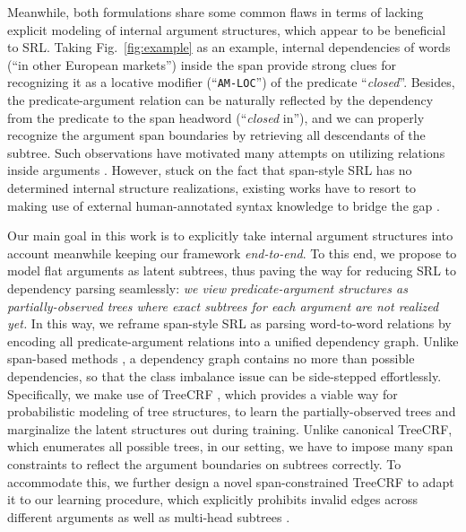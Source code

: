 \documentclass[11pt]{article}
\newcommand{\brickred}[1]{\textcolor{brickred}{#1}}
\begin{document}
Meanwhile, both formulations share some common flaws in terms of lacking explicit modeling of internal argument structures, which appear to be beneficial to SRL.
Taking Fig.~\ref{fig:example} as an example, internal dependencies of words (``in other European markets'') inside the span provide strong clues for recognizing it as a locative modifier (``\texttt{AM-LOC}'') of the predicate ``\emph{\brickred{closed}}''.
Besides, the predicate-argument relation can be naturally reflected by the dependency from the predicate to the span headword (``\emph{\brickred{closed}}  in''), and we can properly recognize the argument span boundaries by retrieving all descendants of the subtree.
Such observations have motivated many attempts on utilizing relations inside arguments \cite[\emph{inter alia}]{gildea-hockenmaier-2003-identifying,johansson-nugues-2008-dependency,johansson-nugues-2008-effect,xia-etal-2019-syntax,li-etal-2019-dependency}.
However, stuck on the fact that span-style SRL has no determined internal structure realizations, existing works have to resort to making use of external human-annotated syntax knowledge to bridge the gap \cite{shi-etal-2020-semantic,li-etal-2021-syntax}.



Our main goal in this work is to explicitly take internal argument structures into account meanwhile keeping our framework \emph{end-to-end}.
To this end, we propose to model flat arguments as latent subtrees, thus paving the way for reducing SRL to dependency parsing seamlessly: \emph{we view predicate-argument structures as partially-observed trees where exact subtrees for each argument are not realized yet.}
In this way, we reframe span-style SRL as parsing word-to-word relations by encoding all predicate-argument relations into a unified dependency graph.
Unlike span-based methods \cite{he-etal-2018-jointly}, a dependency graph contains no more than  possible dependencies, so that the class imbalance issue can be side-stepped effortlessly.
Specifically, we make use of TreeCRF \cite{eisner-2000-bilexical,zhang-etal-2020-efficient}, which provides a viable way for probabilistic modeling of tree structures, to learn the partially-observed trees and marginalize the latent structures out during training.
Unlike canonical TreeCRF, which enumerates all possible trees, in our setting, we have to impose many span constraints to reflect the argument boundaries on subtrees correctly.
To accommodate this, we further design a novel span-constrained TreeCRF to adapt it to our learning procedure, which explicitly prohibits invalid edges across different arguments as well as multi-head subtrees \cite{nivre-etal-2014-squibs,zhang-etal-2021-adapting}.
\end{document}
